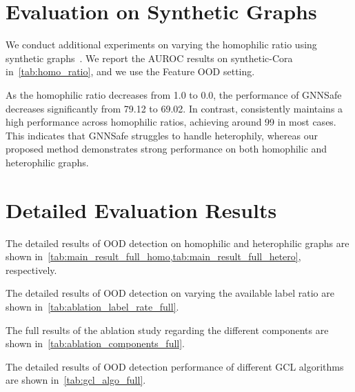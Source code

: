 



\section{Evaluation on Synthetic Graphs}
We conduct additional experiments on varying the homophilic ratio using synthetic graphs~\citep{zhu2021graph}. 
We report the AUROC results on synthetic-Cora in~\cref{tab:homo_ratio}, and we use the Feature OOD setting. 

As the homophilic ratio decreases from 1.0 to 0.0, the performance of GNNSafe decreases significantly from 79.12 to 69.02. In contrast, \shortname consistently maintains a high performance across homophilic ratios, achieving around 99 in most cases. This indicates that GNNSafe struggles to handle heterophily, whereas our proposed method demonstrates strong performance on both homophilic and heterophilic graphs.





\section{Detailed Evaluation Results}
\label{sec:main_result_full}

The detailed results of OOD detection on homophilic and heterophilic graphs are shown in~\cref{tab:main_result_full_homo,tab:main_result_full_hetero}, respectively. 



The detailed results of OOD detection on varying the available label ratio are shown in~\cref{tab:ablation_label_rate_full}.


The full results of the ablation study regarding the different components are shown in~\cref{tab:ablation_components_full}.


The detailed results of OOD detection performance of different GCL algorithms are shown in~\cref{tab:gcl_algo_full}.



\clearpage
\thispagestyle{empty}
